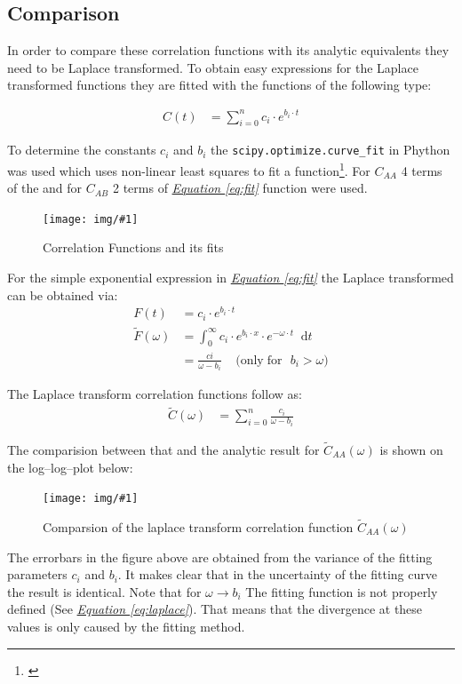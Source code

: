 \documentclass[a4paper, parskip=half]{scrartcl}
\newcommand{\myImage}[2]{
	\begin{figure}[H]
	\centering
	\texttt{[image: img/\#1]}
	\caption{#2}
	\label{pic:#1}
	\end{figure}
}
\newcommand{\diff}{\mathop{}\!\mathrm{d}}
\newcommand{\myEqRef}[1]{\textit{\hyperref[eq:#1]{Equation \ref*{eq:#1}}}}
\newcommand{\myEqLabel}[1]{\label{eq:#1}}
\newcommand{\myCite}[1]{\footnote{\cite{#1} \citeauthor{#1} \citetitle{#1} \citeyear{#1}}}
\begin{document}
\subsection{Comparison}
In order to compare these correlation functions with its analytic equivalents they need to be Laplace transformed. To obtain easy expressions for the Laplace transformed functions they are fitted with the functions of the following type:

\begin{align}
C(t) &= \sum_{i=0}^{n} c_i \cdot e^{b_i \cdot t} \myEqLabel{fit}
\end{align}

To determine the constants $c_i$ and $b_i$ the \verb+scipy.optimize.curve_fit+ in Phython was used which uses non-linear least squares to fit a function\myCite{curvefit}. For $C_{AA}$ 4 terms of the and for $C_{AB}$ 2 terms of \myEqRef{fit} function were used.

\myImage{caa_cab}{Correlation Functions and its fits}

For the simple exponential expression in \myEqRef{fit} the Laplace transformed can be obtained via:
\begin{align}
F(t) &= c_i \cdot e^{b_i \cdot t} \\
\widetilde{F}(\omega) &= \int_0^\infty c_i \cdot e^{b_i\cdot x} \cdot e^{-\omega\cdot t}\diff t \\
&= \frac{ci}{\omega - b_i}\;\;\;\; \mathrm{(only\; for\,\,\,\, } b_i > \omega \mathrm{)} \myEqLabel{laplace}
\end{align}

The Laplace transform correlation functions follow as:
\begin{align}
\widetilde{C}(\omega) &= \sum_{i=0}^n \frac{c_i}{\omega - b_i}
\end{align}

The comparision between that and the analytic result for $\widetilde{C}_{AA}(\omega)$ is shown on the log--log--plot below:

\myImage{compare_lac}{Comparsion of the laplace transform correlation function $\widetilde{C}_{AA}(\omega)$}

The errorbars in the figure above are obtained from the variance of the fitting parameters $c_i$ and $b_i$. It makes clear that in the uncertainty of the fitting curve the result is identical. Note that for $\omega \rightarrow b_i$ The fitting function is not properly defined (See \myEqRef{laplace}). That means that the divergence at these values is only caused by the fitting method.
\end{document}
